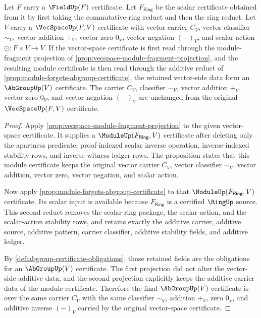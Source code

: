 \begin{corollary}
\label{cor:vecspace-additive-carrier-projection}
Let $F$ carry a $\FieldUp(F)$ certificate. Let $F_{\mathsf{Ring}}$ be the scalar certificate obtained from it by first taking the commutative-ring reduct and then the ring reduct. Let $V$ carry a $\VecSpaceUp(F,V)$ certificate with vector carrier $C_V$, vector classifier $\sim_V$, vector addition $+_V$, vector zero $0_V$, vector negation $(-)_V$, and scalar action $\odot:F\times V\to V$. If the vector-space certificate is first read through the module-fragment projection of \autoref{prop:vecspace-module-fragment-projection}, and the resulting module certificate is then read through the additive reduct of \autoref{prop:module-forgets-abgroup-certificate}, the retained vector-side data form an $\AbGroupUp(V)$ certificate. The carrier $C_V$, classifier $\sim_V$, vector addition $+_V$, vector zero $0_V$, and vector negation $(-)_V$ are unchanged from the original $\VecSpaceUp(F,V)$ certificate.
\end{corollary}
\begin{proof}
Apply \autoref{prop:vecspace-module-fragment-projection} to the given vector-space certificate. It supplies a $\ModuleUp(F_{\mathsf{Ring}},V)$ certificate after deleting only the apartness predicate, proof-indexed scalar inverse operation, inverse-indexed stability rows, and inverse-witness ledger rows. The proposition states that this module certificate keeps the original vector carrier $C_V$, vector classifier $\sim_V$, vector addition, vector zero, vector negation, and scalar action.

Now apply \autoref{prop:module-forgets-abgroup-certificate} to that $\ModuleUp(F_{\mathsf{Ring}},V)$ certificate. Its scalar input is available because $F_{\mathsf{Ring}}$ is a certified $\RingUp$ source. This second reduct removes the scalar-ring package, the scalar action, and the scalar-action stability rows, and retains exactly the additive carrier, additive source, additive pattern, carrier classifier, additive stability fields, and additive ledger.

By \autoref{def:abgroup-certificate-obligations}, those retained fields are the obligations for an $\AbGroupUp(V)$ certificate. The first projection did not alter the vector-side additive data, and the second projection explicitly keeps the additive carrier data of the module certificate. Therefore the final $\AbGroupUp(V)$ certificate is over the same carrier $C_V$ with the same classifier $\sim_V$, addition $+_V$, zero $0_V$, and additive inverse $(-)_V$ carried by the original vector-space certificate.
\end{proof}

